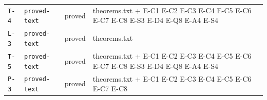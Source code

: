 \begin{longtable}{p{1.6cm}p{3.0cm}p{1.3cm}p{6.8cm}}
\texttt{T-4} & {\footnotesize\texttt{proved-text}} & proved & \footnotesize theorems.txt + E-C1 E-C2 E-C3 E-C4 E-C5 E-C6 E-C7 E-C8 E-S3 E-D4 E-Q8 E-A4 E-S4 \\
\texttt{L-3} & {\footnotesize\texttt{proved-text}} & proved & \footnotesize theorems.txt \\
\texttt{T-5} & {\footnotesize\texttt{proved-text}} & proved & \footnotesize theorems.txt + E-C1 E-C2 E-C3 E-C4 E-C5 E-C6 E-C7 E-C8 E-S3 E-D4 E-Q8 E-A4 E-S4 \\
\texttt{P-3} & {\footnotesize\texttt{proved-text}} & proved & \footnotesize theorems.txt + E-C1 E-C2 E-C3 E-C4 E-C5 E-C6 E-C7 E-C8 \\
\bottomrule
\end{longtable}
